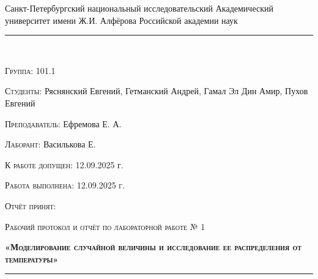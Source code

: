 \documentclass[12pt]{article}
\begin{document}
\begin{center}
    \large\textrm{Санкт-Петербургский национальный исследовательский Академический университет имени Ж.И. Алфёрова Российской академии наук}
\end{center}

\noindent\rule{\textwidth}{0.5pt}\\

\begin{minipage}{0.5\textwidth}
  \begin{flushleft}
	\textsc{Группа:} 101.1
	
	\textsc{Студенты:} Ряснянский Евгений, Гетманский Андрей, Гамал Эл Дин Амир, Пухов Евгений
	
	\textsc{Преподаватель:} Ефремова Е. А.
	
	\textsc{Лаборант:} Василькова Е.
  \end{flushleft}
\end{minipage}
\begin{minipage}{0.5\textwidth}
  \begin{flushleft}
	\textsc{К работе допущен:} 12.09.2025 г.
	
	\textsc{Работа выполнена: 12.09.2025 г.}
	
	\textsc{Отчёт принят:}
  \end{flushleft}
\end{minipage}


\begin{center}
     \large\textsc{Рабочий протокол и отчёт по лабораторной работе № 1}
    
    \textbf{\textsc{«Моделирование случайной величины и исследование ее распределения
от температуры»}}
\end{center}

\noindent\rule{\textwidth}{0.5pt}\\
\end{document}
